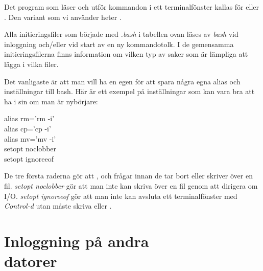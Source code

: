 \documentclass[a4paper,twocolumn]{book}
\begin{document}
Det program som läser och utför kommandon i ett terminalfönster kallas
för  eller . Den variant som vi
använder heter .

Alla initieringsfiler som började med \emph{.bash} i tabellen ovan läses
av \emph{bash} vid inloggning och/eller vid start av en ny
kommandotolk. I de gemensamma initieringsfilerna finns information om
vilken typ av saker som är lämpliga att lägga i vilka filer.

Det vanligaste är att man vill ha en egen  för att
spara några egna alias och inställningar till bash. Här är ett exempel
på inställningar som kan vara bra att ha i sin  om man
är nybörjare:
\begin{ttquote}
  alias rm='rm -i' \\
  alias cp='cp -i' \\
  alias mv='mv -i' \\
  setopt noclobber \\
  setopt ignoreeof
\end{ttquote}
De tre första raderna gör att ,  och
 frågar innan de tar bort eller skriver över en fil.
\emph{setopt noclobber} gör att man inte kan skriva över en fil genom
att dirigera om I/O. \emph{setopt ignoreeof} gör att man inte kan
avsluta ett terminalfönster med \emph{Control-d} utan måste skriva
 eller .

%
%

\section{Inloggning på andra \\ datorer}
\end{document}
